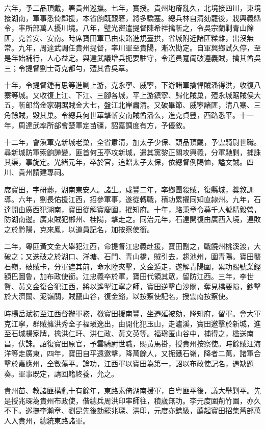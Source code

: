 \begin{pinyinscope}
六年，予二品頂戴，署貴州巡撫。七年，實授。貴州地瘠亂久，北境接四川，東境接湖南，軍事悉倚鄰援，本省餉既艱窘，將多驕蹇。總兵林自清劾罷後，戕興義縣令，率所部萬人擾川境。八年，璧光密遣提督陳希祥擒斬之，令吳宗蘭剿青山餘匪，克普安、安南。時席寶田軍已由東路進規臺拱，省城附近諸匪糅雜，出沒無常。九年，周達武調任貴州提督，率川軍至貴陽，漸次勘定。自軍興鄉試久停，至是年始補行，人心益定。與達武議增兵扼要駐守，令道員蹇訚破遵義賊，擒其酋吳三；令提督劉士奇克都勻，殪其酋吳章。

十年，令提督鍾有思等進剿上游，克永寧、威寧，下游諸軍擒悍賊潘得洪，收復八寨等城。又收復上江、下江、三腳各城，平上游鎮寧、歸化賊巢，殪永城踞賊侯大五，斬郎岱金家硐踞賊金大七，盤江北岸肅清。又破畢節、威寧諸匪，清八寨、三角餘賊，毀其巢。令總兵何世華擊斬安南賊酋潘么，進克貞豐，西路悉平。十一年，周達武率所部會楚軍定苗疆，詔嘉調度有方，予優敘。

十二年，會滇軍克新城老巢，全省肅清，加太子少保、頭品頂戴，予雲騎尉世職。尋新城防軍索餉譁變，匪首何玉亭攻新城，遣其黨黎正關攻興義，分軍馳剿，捕誅其渠，事旋定。光緒元年，卒於官，追贈太子太保，依總督例賜恤，謚文誠。四川、貴州請建專祠。

席寶田，字研薌，湖南東安人。諸生。咸豐二年，率鄉團殺賊，復縣城，獎敘訓導。六年，劉長佑援江西，招參軍事，遂從轉戰，積功累擢同知直隸州。九年，石達開由廣西犯湖南，寶田從解寶慶圍，擢知府。十年，駱秉章令募千人號精毅營，防湖南邊。廣東賊犯郴州、桂陽，擊走之。同治元年，石達開復由廣西入境，連敗之於黔陽，克來鳳，以道員記名，加按察使銜。

二年，粵匪黃文金大舉犯江西，命提督江忠義赴援，寶田副之，戰饒州桃溪渡，大破之；又迭破之於湖口、洋塘、石門、青山橋，賊引去，趨池州，圍青陽。寶田襲石嶺，破賊卡，分軍遮其前，命水陸夾擊，文金遁走，遂解青陽圍，累功賜號業鏗額巴圖魯，加布政使銜。江忠義卒於軍，寶田代領其眾，留防江西。三年，李世賢、黃文金復合犯江西，將以遙掣江寧之師，寶田逆擊白沙關，奪見橋要隘，鈔擊於大濟關、泥嶺關，賊竄山谷，復金谿，以按察使記名，授雲南按察使。

時楊岳斌初至江西督辦軍務，檄寶田援南豐，坐遷延被劾，降知府，留軍。會大軍克江寧，群賊擁洪秀全子福瑱逸出，由開化犯玉山，走瀘溪，寶田邀擊於新城，進至石城楊家牌，擒洪仁玕、洪仁政、黃文英等。福瑱匿山谷中，捕得之，檻送南昌，伏誅。詔復寶田原官，予雲騎尉世職，賜黃馬褂，授貴州按察使。時餘賊汪海洋等走廣東，四年，寶田自平遠邀擊，降萬餘人，又扼鐵石嶺，降者二萬，諸軍合擊於嘉應州，全數蕩平。論功，江西軍以寶田為第一，詔以布政使記名，遇缺題奏。軍事既定，請回籍終養，允之。

貴州苗、教諸匪構亂十有餘年，東路素倚湖南援軍，自粵匪平後，議大舉剿平。先是授兆琛為貴州布政使，偕總兵周洪印率師往，積歲無功。李元度圍荊竹園，亦久不下。巡撫李瀚章、劉昆先後劾罷兆琛、洪印，元度亦鐫級，薦起寶田招集舊部萬人入貴州，總統東路諸軍。


\end{pinyinscope}
